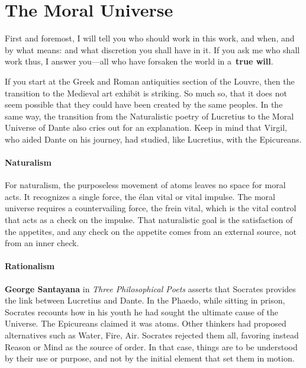 \section{The Moral Universe}

\begin{quotex}

First and foremost, I will tell you who should work in this work, and when, and by what means: and what discretion you shall have in it. If you ask me who shall work thus, I answer you—all who have forsaken the world in a \textbf{true will}. 

\end{quotex}
If you start at the Greek and Roman antiquities section of the Louvre, then the transition to the Medieval art exhibit is striking. So much so, that it does not seem possible that they could have been created by the same peoples. In the same way, the transition from the Naturalistic poetry of Lucretius to the Moral Universe of Dante also cries out for an explanation. Keep in mind that Virgil, who aided Dante on his journey, had studied, like Lucretius, with the Epicureans.

\paragraph{Naturalism}
For naturalism, the purposeless movement of atoms leaves no space for moral acts. It recognizes a single force, the élan vital or vital impulse. The moral universe requires a countervailing force, the frein vital, which is the vital control that acts as a check on the impulse. That naturalistic goal is the satisfaction of the appetites, and any check on the appetite comes from an external source, not from an inner check.

\paragraph{Rationalism}
\textbf{George Santayana} in \emph{Three Philosophical Poets} asserts that Socrates provides the link between Lucretius and Dante. In the Phaedo, while sitting in prison, Socrates recounts how in his youth he had sought the ultimate cause of the Universe. The Epicureans claimed it was atoms. Other thinkers had proposed alternatives such as Water, Fire, Air. Socrates rejected them all, favoring instead Reason or Mind as the source of order. In that case, things are to be understood by their use or purpose, and not by the initial element that set them in motion.

